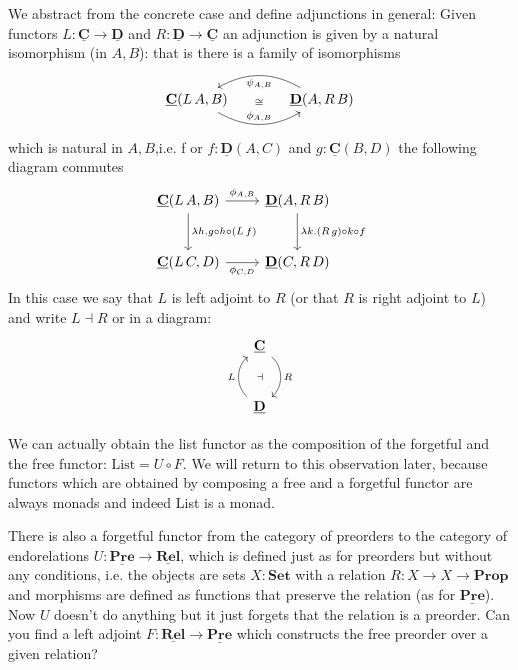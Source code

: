 \documentclass{article}
\newcommand{\Prop}{\mathbf{Prop}}
\newcommand{\Set}{\mathbf{Set}}
\newcommand{\cat}[1]{\underline{\mathbf{#1}}}
\newcommand{\List}{\mathrm{List}}
\begin{document}
We abstract from the concrete case and define adjunctions in general: Given functors $L : \cat{C} \to \cat{D}$ and $R : \cat{D} \to \cat{C}$ an adjunction is given by a natural isomorphism (in $A,B$): that is there is a family of isomorphisms 
\[\begin{tikzcd}[column sep = large]
\cat{C}(L\,A,B) \arrow[r,"\phi_{A,B}",bend right,"\cong" above=11] & \cat{D}(A,R\,B) \arrow[l,"\psi_{A,B}",bend right]
\end{tikzcd}\]
which is natural in $A,B$,i.e. f or $f:\cat{D}(A,C)$ and $g : \cat{C}(B,D)$ the following diagram commutes
\[\begin{tikzcd}[row sep = large]
    \cat{C}(L\,A,B) \arrow[r,"\phi_{A,B}"] \arrow[d,"\lambda h. g\circ h \circ (L\,f)"] & \cat{D}(A,R\,B)  \arrow[d,"\lambda k. (R\,g)\circ k \circ f"] \\
    \cat{C}(L\,C,D) \arrow[r,"\phi_{C,D}" below]  & \cat{D}(C,R\,D)  
\end{tikzcd}\]
In this case we say that $L$ is left adjoint to $R$ (or that $R$ is right adjoint to $L$) and write $L \dashv R$ or in a diagram:
\[\begin{tikzcd}[row sep=large]
\cat{C} \arrow[d,bend left = 50,"R" right,"\dashv" left = 10] \\ 
\cat{D} \arrow[u,bend left = 50,"L" left, ]
\end{tikzcd}\]

We can actually obtain the list functor as the composition of the forgetful and the free functor: $\List = U \circ F$. We will return to this observation later, because functors which are obtained by composing a free and a forgetful functor are always monads and indeed List is a monad.

\begin{Exercise}
\label{ex:free-preorder}
  There is also a forgetful functor from the category of preorders to the category of endorelations $U : \cat{Pre} \to \cat{Rel}$, which is defined just as for preorders but without any conditions, i.e. the objects are sets $X:\Set$ with a relation $R : X\to X\to\Prop$ and morphisms are defined as functions that preserve the relation (as for $\cat{Pre}$). Now $U$ doesn't do anything but it just forgets that the relation is a preorder. Can you find a left adjoint $F : \cat{Rel} \to \cat{Pre}$ which constructs the free preorder over a given relation?
\end{Exercise}
\end{document}

